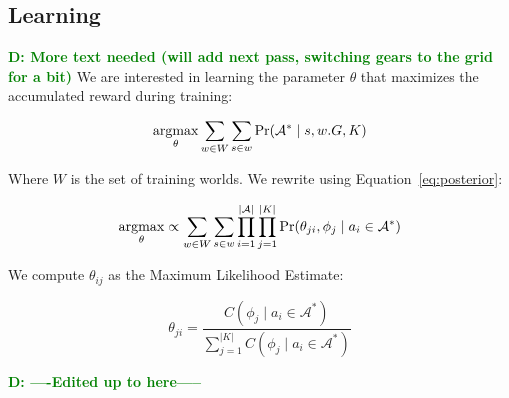 \documentclass[conference]{IEEEtran}
\newcommand{\dnote}[1]{\textcolor{Green}{\textbf{D: #1}}}
\newcommand{\argmax}{\operatornamewithlimits{argmax}}
\begin{document}
\subsection{Learning}
\dnote{More text needed (will add next pass, switching gears to the grid for a bit)}
We are interested in learning the parameter $\theta$ that maximizes the accumulated reward
during training:

\begin{equation}
\argmax_\theta \sum_{w \in W} \sum_{s \in w} \Pr(\mathcal{A}^* \mid s, w.G, K)
\end{equation}

Where $W$ is the set of training worlds. We rewrite using Equation~\ref{eq:posterior}:

\begin{equation}
\argmax_\theta \propto \sum_{w \in W} \sum_{s \in w} \prod_{i=1}^{|\mathcal{A}|} \prod_{j=1}^{|K|} \Pr(\theta_{ji}, \phi_j \mid a_i \in \mathcal{A}^*)
\end{equation}

We compute $\theta_{ij}$ as the Maximum Likelihood Estimate:

\begin{equation}
\theta_{ji} = \frac{C(\phi_j \mid a_i \in \mathcal{A}^*)}{\sum \limits_{j=1}^{|K|} C(\phi_j \mid a_i \in \mathcal{A}^*)}
\end{equation}

\dnote{----Edited up to here-----}
\end{document}

